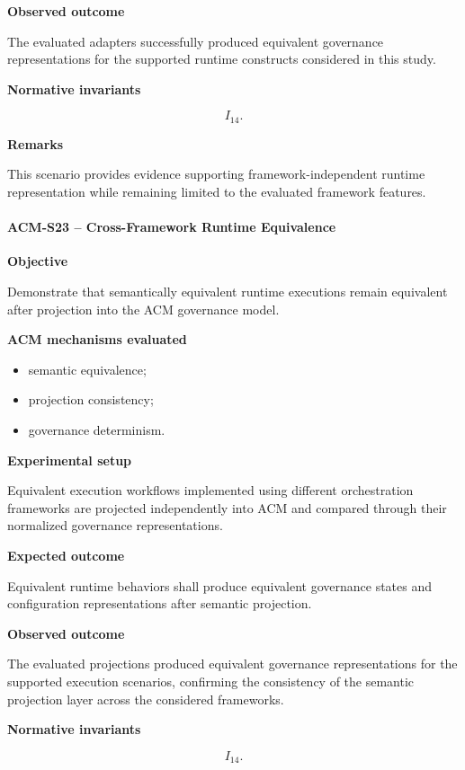 \documentclass[10pt]{article}
\begin{document}
\textbf{Observed outcome}

The evaluated adapters successfully produced equivalent governance
representations for the supported runtime constructs considered in this study.

\textbf{Normative invariants}

\[
I_{14}.
\]

\textbf{Remarks}

This scenario provides evidence supporting framework-independent runtime
representation while remaining limited to the evaluated framework features.

\paragraph{ACM-S23 -- Cross-Framework Runtime Equivalence}

\textbf{Objective}

Demonstrate that semantically equivalent runtime executions remain equivalent
after projection into the ACM governance model.

\textbf{ACM mechanisms evaluated}

\begin{itemize}
    \item semantic equivalence;
    \item projection consistency;
    \item governance determinism.
\end{itemize}

\textbf{Experimental setup}

Equivalent execution workflows implemented using different orchestration
frameworks are projected independently into ACM and compared through their
normalized governance representations.

\textbf{Expected outcome}

Equivalent runtime behaviors shall produce equivalent governance states and
configuration representations after semantic projection.

\textbf{Observed outcome}

The evaluated projections produced equivalent governance representations for
the supported execution scenarios, confirming the consistency of the semantic
projection layer across the considered frameworks.

\textbf{Normative invariants}

\[
I_{14}.
\]
\end{document}
